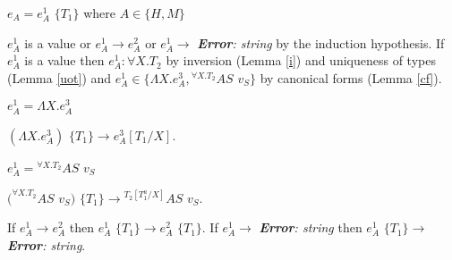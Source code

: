 \begin{case}

$e_{A}=e_{A}^{1}$ $\lbrace T_{1}\rbrace$ where $A\in\lbrace H,M\rbrace$

$e_{A}^{1}$ is a value or $e_{A}^{1}\rightarrow e_{A}^{2}$ or $e_{A}^{1}\rightarrow$ \emph{\textbf{Error}: string} by the induction hypothesis.  If $e_{A}^{1}$ is a value then $e_{A}^{1}:\forall X.T_{2}$ by inversion (Lemma \ref{i}) and uniqueness of types (Lemma \ref{uot}) and $e_{A}^{1}\in\lbrace\Lambda X.e_{A}^{3},{^{\forall X.T_{2}}A}S$ $v_{S}\rbrace$ by canonical forms (Lemma \ref{cf}).

\begin{subcase}

$e_{A}^{1}=\Lambda X.e_{A}^{3}$

$(\Lambda X.e_{A}^{3})$ $\lbrace T_{1}\rbrace\rightarrow e_{A}^{3}[T_{1}/X]$.

\end{subcase}

\begin{subcase}

$e_{A}^{1}={^{\forall X.T_{2}}A}S$ $v_{S}$

$(^{\forall X.T_{2}}AS$ $v_{S})$ $\lbrace T_{1}\rbrace\rightarrow{^{T_{2}[T_{1}^{a}/X]}A}S$ $v_{S}$.

\end{subcase}

If $e_{A}^{1}\rightarrow e_{A}^{2}$ then $e_{A}^{1}$ $\lbrace T_{1}\rbrace\rightarrow e_{A}^{2}$ $\lbrace T_{1}\rbrace$.  If $e_{A}^{1}\rightarrow$ \emph{\textbf{Error}: string} then $e_{A}^{1}$ $\lbrace T_{1}\rbrace\rightarrow$ \emph{\textbf{Error}: string}.

\end{case}